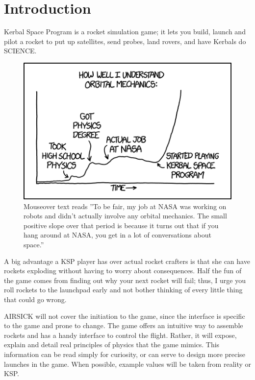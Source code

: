 \chapter*{Introduction}


Kerbal Space Program \cite{ksp} is a rocket simulation game; it lets
you build, launch and pilot a rocket to put up satellites, send probes,
land rovers, and have Kerbals do SCIENCE.

\begin{figure}[H]
\includegraphics[width=\textwidth]{img/xkcd1356.png}
\caption{
	Mouseover text reads ”To be fair, my job at NASA was working
	on robots and didn't actually involve any orbital mechanics. The
	small positive slope over that period is because it turns out
	that if you hang around at NASA, you get in a lot of conversations
	about space.” \cite{xkcd1356}
}
\end{figure}

A big advantage a KSP player has over actual rocket crafters is that she
can have rockets exploding without having to worry about consequences.
Half the fun of the game comes from finding out why your next rocket
will fail; thus, I urge you roll rockets to the launchpad early and not
bother thinking of every little thing that could go wrong.

AIRSICK will not cover the initiation to the game, since the interface is
specific to the game and prone to change. The game offers an intuitive
way to assemble rockets and has a handy interface to control the
flight. Rather, it will expose, explain and detail real principles of
physics that the game mimics. This information can be read simply for
curiosity, or can serve to design more precise launches in the game. When
possible, example values will be taken from reality or KSP.

